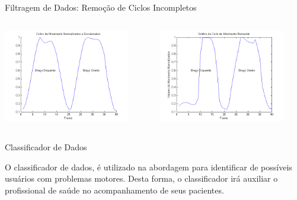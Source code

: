 \documentclass{beamer}
\begin{document}
\begin{frame}{Filtragem de Dados: Remoção de Ciclos Incompletos}
   \begin{block}{}
   
   \begin{columns}[c]
     \begin{column}{0.5\linewidth}
				\includegraphics[width=5.5cm]{img/ciclonormalizadoescalonado.png}
     \end{column}

     \begin{column}{0.55\linewidth}
				\includegraphics[width=5.5cm]{img/ciclomovimentoremovido.png}
    \end{column}
\end{columns}
\end{block}
\end{frame}

\begin{frame}{Classificador de Dados}
\begin{block}{}
			O classificador de dados, é utilizado na abordagem para identificar de possíveis usuários com problemas motores. Desta forma, o classificador irá auxiliar o profissional de saúde no acompanhamento de seus pacientes.
\end{block}
\end{frame}
\end{document}
